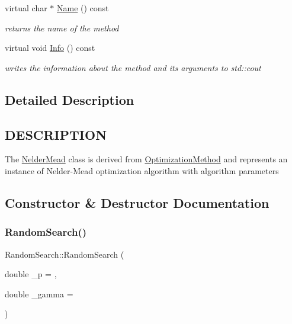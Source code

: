 \begin{DoxyCompactItemize}
\mbox{\label{class_random_search_a3fcfd10ed0c2227c0bd7647e1a9be403}} 
virtual char $\ast$ \hyperlink{class_random_search_a3fcfd10ed0c2227c0bd7647e1a9be403}{Name} () const
\begin{DoxyCompactList}\small\item\em returns the name of the method \end{DoxyCompactList}\item 
\mbox{\label{class_random_search_a3229882f90a1a956d204447bd76781a4}} 
virtual void \hyperlink{class_random_search_a3229882f90a1a956d204447bd76781a4}{Info} () const
\begin{DoxyCompactList}\small\item\em writes the information about the method and its arguments to std\+::cout \end{DoxyCompactList}\end{DoxyCompactItemize}


\subsection{Detailed Description}
\hypertarget{function_8h_DESCRIPTION}{}\subsection{D\+E\+S\+C\+R\+I\+P\+T\+I\+ON}\label{function_8h_DESCRIPTION}
The \hyperlink{class_nelder_mead}{Nelder\+Mead} class is derived from \hyperlink{class_optimization_method}{Optimization\+Method} and represents an instance of Nelder-\/\+Mead optimization algorithm with algorithm parameters 

\subsection{Constructor \& Destructor Documentation}
\mbox{\label{class_random_search_a92e55b6d0dee76ebbae1c03685c25499}} 
\subsubsection{\texorpdfstring{Random\+Search()}{RandomSearch()}}
{\footnotesize\ttfamily Random\+Search\+::\+Random\+Search (\begin{DoxyParamCaption}\item[{double}]{\+\_\+p = {},  }\item[{double}]{\+\_\+gamma = {} }\end{DoxyParamCaption})\hspace{0.3cm}{\ttfamily [inline]}}

